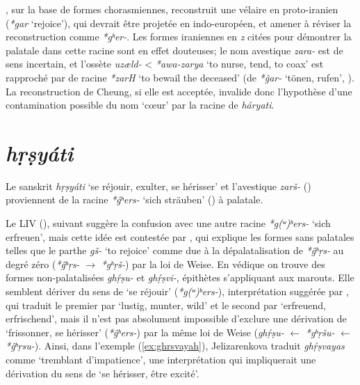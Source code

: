 \documentclass{article}
\newcommand{\ipa}[1]{{\phon\textit{#1}}}
\begin{document}
\citet[104]{cheung07dictionary}, sur la base de formes chorasmiennes, reconstruit une vélaire en proto-iranien (\ipa{*gar} `rejoice'), qui devrait être projetée en indo-européen, et amener à réviser la reconstruction comme \ipa{*gʰer-}. Les formes iraniennes en \ipa{z} citées pour démontrer la palatale dans cette racine sont en effet douteuses; le nom avestique \ipa{zara-} est de sens incertain, et l'ossète \ipa{uzæld-} < \ipa{*awa-zarya} `to nurse, tend, to coax' est rapproché par  \citet[470]{cheung07dictionary} de racine \ipa{*zarH} `to bewail the deceased' (de \ipa{*ĝar-} `tönen, rufen', \citealt[161]{liv}). La reconstruction de Cheung, si elle est acceptée, invalide donc l'hypothèse d'une contamination possible du nom `cœur' par  la racine de \ipa{háryati}.

\section{\ipa{hṛṣyáti}} \label{sec:hrsyati}
Le sanskrit \ipa{hṛṣyáti} `se réjouir, exulter, se hérisser' et l'avestique \ipa{zarš-} (\citealt[471]{cheung07dictionary}) proviennent de la racine \ipa{*ĝʰers-} `sich sträuben' (\citealt[178]{liv}) à palatale. 

Le LIV (\citealt[198]{liv}), suivant \citet[808]{mayrhofer92ewa}  suggère la confusion avec une autre racine \ipa{*g(ʷ)ʰers-} `sich erfreuen', mais cette idée est contestée par \citet[471]{cheung07dictionary}, qui explique les formes sans palatales telles que le parthe \ipa{gš-} `to rejoice' comme due à la dépalatalisation de \ipa{*ĝʰṛs-} au degré zéro (\ipa{*ĝʰṛs-} $\rightarrow$ \ipa{*gʰṛš-}) par la loi de Weise. En védique on trouve des formes non-palatalisées \ipa{ghṛ́ṣu-} et \ipa{ghṛ́ṣvi-}, épithètes s'appliquant aux marouts. Elle semblent dériver du sens de `se réjouir' (\ipa{*g(ʷ)ʰers-}), interprétation suggérée par \citet{grassmann1874}, qui traduit le premier par `lustig, munter, wild' et le second par `erfreuend, erfrischend', mais il n'est pas absolument impossible d'exclure  une dérivation de `frissonner, se hérisser' (\ipa{*ĝʰers-}) par la même loi de Weise (\ipa{ghṛ́ṣu-} $\leftarrow$ \ipa{*gʰṛšu-} $\leftarrow$ \ipa{*ĝʰṛsu-}). Ainsi, dans l'exemple (\ref{ex:ghrsvayah}), Jelizarenkova traduit \ipa{ghṛ́ṣvayas} comme `tremblant d'impatience', une interprétation qui impliquerait une dérivation du sens de `se hérisser, être excité'.

\end{document}
